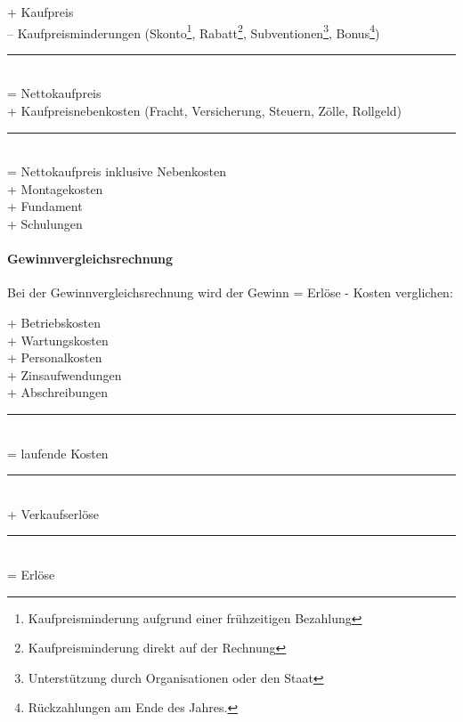 \documentclass[../main.tex]{subfiles}
\begin{document}
                    \noindent + Kaufpreis\\
                    \noindent -- Kaufpreisminderungen (Skonto\footnote{Kaufpreisminderung aufgrund einer frühzeitigen Bezahlung}, Rabatt\footnote{Kaufpreisminderung direkt auf der Rechnung}, Subventionen\footnote{Unterstützung durch Organisationen oder den Staat}, Bonus\footnote{Rückzahlungen am Ende des Jahres.})\\
                    \noindent\rule{2cm}{0.4pt}\\
                    \noindent = Nettokaufpreis\\
                    \noindent + Kaufpreisnebenkosten (Fracht, Versicherung, Steuern, Zölle, Rollgeld)\\
                    \noindent\rule{2cm}{0.4pt}\\
                    \noindent = Nettokaufpreis inklusive Nebenkosten\\
                    \noindent + Montagekosten\\
                    \noindent + Fundament\\
                    \noindent + Schulungen  

                \paragraph{Gewinnvergleichsrechnung}
                    Bei der Gewinnvergleichsrechnung wird der Gewinn = Erlöse - Kosten verglichen:
                    
                    \noindent + Betriebskosten\\
                    \noindent + Wartungskosten\\
                    \noindent + Personalkosten\\
                    \noindent + Zinsaufwendungen\\
                    \noindent + Abschreibungen\\
                    \noindent\rule{2cm}{0.4pt}\\
                    \noindent = laufende Kosten\\                
                    \noindent\rule{8cm}{0.4pt}\\
                    \noindent + Verkaufserlöse\\
                    \noindent\rule{2cm}{0.4pt}\\
                    \noindent = Erlöse\\
                    
\end{document}
